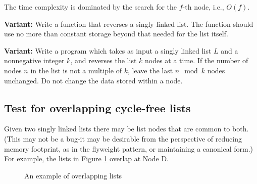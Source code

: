 \documentclass[11pt,a4paper]{article}
\begin{document}
The time complexity is dominated by the search for the $f$-th node, i.e.,
$O(f)$.

\textbf{Variant:} Write a function that reverses a singly linked list. The
function should use no more than constant storage beyond that needed for the
list itself.

\textbf{Variant:} Write a program which takes as input a singly linked list
$L$ and a nonnegative integer $k$, and reverses the list $k$ nodes at a time.
If the number of nodes $n$ in the list is not a multiple of $k$, leave the
last $n\mod k$ nodes unchanged. Do not change the data stored within a
node.

\subsection{Test for overlapping cycle-free lists}

Given two singly linked lists there may be list nodes that are common to both.
(This may not be a bug-it may be desirable from the perspective of reducing
memory footprint, as in the flyweight pattern, or maintaining a canonical
form.) For example, the lists in Figure \ref{fig:overlappinglists} overlap at 
Node D.

\begin{figure}[hb]
  \centering
  \caption{An example of overlapping lists}
  \label{fig:overlappinglists}
\end{figure}
\end{document}

